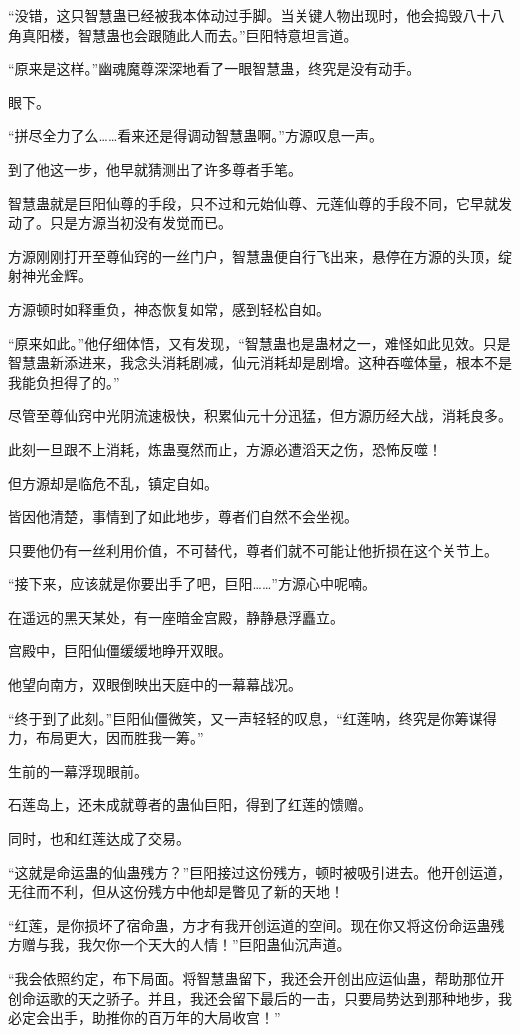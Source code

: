 \begin{this_body}
“没错，这只智慧蛊已经被我本体动过手脚。当关键人物出现时，他会捣毁八十八角真阳楼，智慧蛊也会跟随此人而去。”巨阳特意坦言道。

“原来是这样。”幽魂魔尊深深地看了一眼智慧蛊，终究是没有动手。

眼下。

“拼尽全力了么……看来还是得调动智慧蛊啊。”方源叹息一声。

到了他这一步，他早就猜测出了许多尊者手笔。

智慧蛊就是巨阳仙尊的手段，只不过和元始仙尊、元莲仙尊的手段不同，它早就发动了。只是方源当初没有发觉而已。

方源刚刚打开至尊仙窍的一丝门户，智慧蛊便自行飞出来，悬停在方源的头顶，绽射神光金辉。

方源顿时如释重负，神态恢复如常，感到轻松自如。

“原来如此。”他仔细体悟，又有发现，“智慧蛊也是蛊材之一，难怪如此见效。只是智慧蛊新添进来，我念头消耗剧减，仙元消耗却是剧增。这种吞噬体量，根本不是我能负担得了的。”

尽管至尊仙窍中光阴流速极快，积累仙元十分迅猛，但方源历经大战，消耗良多。

此刻一旦跟不上消耗，炼蛊戛然而止，方源必遭滔天之伤，恐怖反噬！

但方源却是临危不乱，镇定自如。

皆因他清楚，事情到了如此地步，尊者们自然不会坐视。

只要他仍有一丝利用价值，不可替代，尊者们就不可能让他折损在这个关节上。

“接下来，应该就是你要出手了吧，巨阳……”方源心中呢喃。

在遥远的黑天某处，有一座暗金宫殿，静静悬浮矗立。

宫殿中，巨阳仙僵缓缓地睁开双眼。

他望向南方，双眼倒映出天庭中的一幕幕战况。

“终于到了此刻。”巨阳仙僵微笑，又一声轻轻的叹息，“红莲呐，终究是你筹谋得力，布局更大，因而胜我一筹。”

生前的一幕浮现眼前。

石莲岛上，还未成就尊者的蛊仙巨阳，得到了红莲的馈赠。

同时，也和红莲达成了交易。

“这就是命运蛊的仙蛊残方？”巨阳接过这份残方，顿时被吸引进去。他开创运道，无往而不利，但从这份残方中他却是瞥见了新的天地！

“红莲，是你损坏了宿命蛊，方才有我开创运道的空间。现在你又将这份命运蛊残方赠与我，我欠你一个天大的人情！”巨阳蛊仙沉声道。

“我会依照约定，布下局面。将智慧蛊留下，我还会开创出应运仙蛊，帮助那位开创命运歌的天之骄子。并且，我还会留下最后的一击，只要局势达到那种地步，我必定会出手，助推你的百万年的大局收宫！”


\end{this_body}

